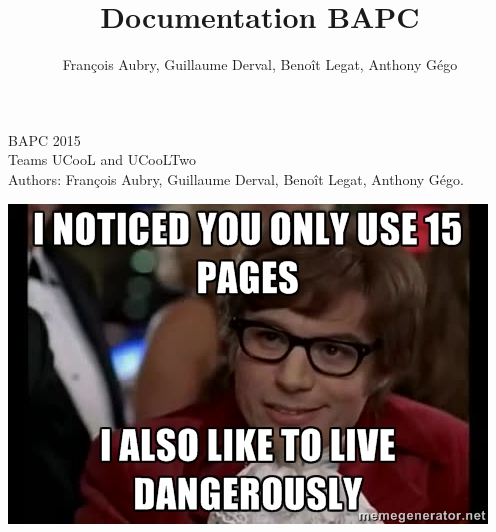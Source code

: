\documentclass[2pt,a4paper]{article}
\author{François Aubry, Guillaume Derval, Benoît Legat, Anthony Gégo}
\title{Documentation BAPC}
\begin{document}
\begin{multicols}{2}
{\Huge BAPC 2015}\\
{\Large Teams UCooL and UCooLTwo}\\
Authors: François Aubry, Guillaume Derval, Benoît Legat, Anthony Gégo.
\tableofcontents







\begin{center}
\includegraphics[width=\linewidth]{dangerously.jpg}
\end{center}
\end{multicols}
\end{document}
